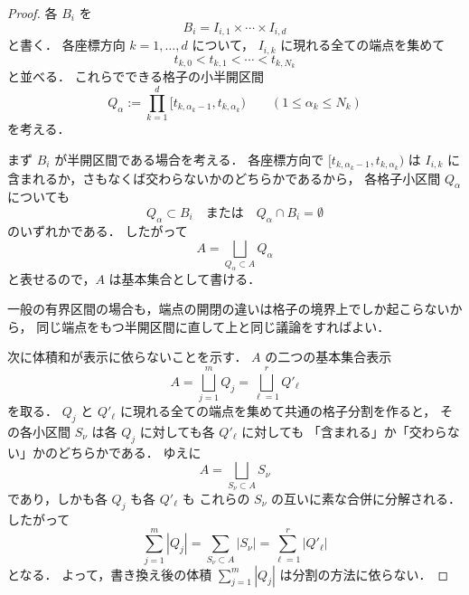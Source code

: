 \begin{proof}
各 $B_i$ を
\[
B_i = I_{i,1} \times \cdots \times I_{i,d}
\]
と書く．
各座標方向 $k=1,\dots,d$ について，
$I_{i,k}$ に現れる全ての端点を集めて
\[
t_{k,0} < t_{k,1} < \cdots < t_{k,N_k}
\]
と並べる．
これらでできる格子の小半開区間
\[
Q_\alpha
:=
\prod_{k=1}^d [t_{k,\alpha_k-1},t_{k,\alpha_k})
\qquad
(1 \le \alpha_k \le N_k)
\]
を考える．

まず $B_i$ が半開区間である場合を考える．
各座標方向で
$[t_{k,\alpha_k-1},t_{k,\alpha_k})$ は
$I_{i,k}$ に含まれるか，さもなくば交わらないかのどちらかであるから，
各格子小区間 $Q_\alpha$ についても
\[
Q_\alpha \subset B_i
\quad\text{または}\quad
Q_\alpha \cap B_i = \emptyset
\]
のいずれかである．
したがって
\[
A
=
\bigsqcup_{Q_\alpha \subset A} Q_\alpha
\]
と表せるので，$A$ は基本集合として書ける．

一般の有界区間の場合も，端点の開閉の違いは格子の境界上でしか起こらないから，
同じ端点をもつ半開区間に直して上と同じ議論をすればよい．

次に体積和が表示に依らないことを示す．
$A$ の二つの基本集合表示
\[
A = \bigsqcup_{j=1}^m Q_j = \bigsqcup_{\ell=1}^r Q'_\ell
\]
を取る．
$Q_j$ と $Q'_\ell$ に現れる全ての端点を集めて共通の格子分割を作ると，
その各小区間 $S_\nu$ は各 $Q_j$ に対しても各 $Q'_\ell$ に対しても
「含まれる」か「交わらない」かのどちらかである．
ゆえに
\[
A = \bigsqcup_{S_\nu \subset A} S_\nu
\]
であり，しかも各 $Q_j$ も各 $Q'_\ell$ も
これらの $S_\nu$ の互いに素な合併に分解される．
したがって
\[
\sum_{j=1}^m |Q_j|
=
\sum_{S_\nu \subset A} |S_\nu|
=
\sum_{\ell=1}^r |Q'_\ell|
\]
となる．
よって，書き換え後の体積 $\sum_{j=1}^m |Q_j|$ は分割の方法に依らない．
\end{proof}
